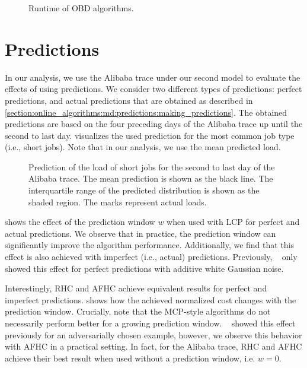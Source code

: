 \begin{figure}
    \centering
    
    \caption{Runtime of OBD algorithms.}\label{fig:case_studies:md:obd:runtimes}
\end{figure}

\section{Predictions}

In our analysis, we use the Alibaba trace under our second model to evaluate the effects of using predictions. We consider two different types of predictions: perfect predictions, and actual predictions that are obtained as described in \cref{section:online_algorithms:md:predictions:making_predictions}. The obtained predictions are based on the four preceding days of the Alibaba trace up until the second to last day.  visualizes the used prediction for the most common job type (i.e., short jobs). Note that in our analysis, we use the mean predicted load.

\begin{figure}
    \centering
    
    \caption{Prediction of the load of short jobs for the second to last day of the Alibaba trace. The mean prediction is shown as the black line. The interquartile range of the predicted distribution is shown as the shaded region. The marks represent actual loads.}\label{fig:case_studies:predictions:prediction}
\end{figure}

 shows the effect of the prediction window $w$ when used with LCP for perfect and actual predictions. We observe that in practice, the prediction window can significantly improve the algorithm performance. Additionally, we find that this effect is also achieved with imperfect (i.e., actual) predictions. Previously, \citeauthor*{Lin2011}~\cite{Lin2011} only showed this effect for perfect predictions with additive white Gaussian noise.

Interestingly, RHC and AFHC achieve equivalent results for perfect and imperfect predictions.  shows how the achieved normalized cost changes with the prediction window. Crucially, note that the MCP-style algorithms do not necessarily perform better for a growing prediction window. \citeauthor*{Lin2012}~\cite{Lin2012} showed this effect previously for an adversarially chosen example, however, we observe this behavior with AFHC in a practical setting. In fact, for the Alibaba trace, RHC and AFHC achieve their best result when used without a prediction window, i.e. $w = 0$.


